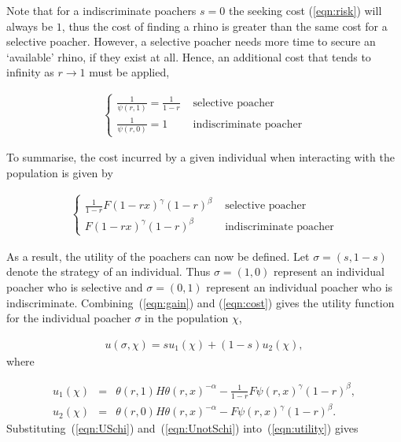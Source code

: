\documentclass[10pt]{article}
\begin{document}
Note that for a indiscriminate poachers \(s = 0\) the seeking 
cost (\ref{eqn:risk}) will always be \(1\), thus the cost of finding a rhino is greater
than the same cost for a selective poacher. However, a selective poacher needs 
more time to secure an `available' rhino, if they exist at all. Hence, an 
additional cost that tends to infinity as \(r \rightarrow 1\) must be applied, 

\begin{eqnarray}
    \label{eqn:selective_cost}
    \left\{
    \begin{array}{cl}
    \frac{1}{\psi(r, 1)} = \frac{1}{1 - r} & \mbox{ selective poacher}
    \\
    \frac{1}{\psi(r, 0)} = 1 & \mbox{ indiscriminate poacher}
    \end{array} \right.
\end{eqnarray}

To summarise, the cost incurred by a given individual when interacting with
the population is given by 

\begin{eqnarray}
    \label{eqn:cost}
    \left\{
    \begin{array}{cl}
    \frac{1}{1 - r}  F(1- rx)^{\gamma} (1-r)^{\beta}& \mbox{ selective poacher}
    \\
    F(1 - rx)^{\gamma} (1-r)^{\beta}& \mbox{ indiscriminate poacher}
    \end{array} \right.
\end{eqnarray}

As a result, the utility of the poachers can now be defined. Let \(\sigma = (s, 1 - s)\)
denote the strategy of an individual. Thus \(\sigma = (1, 0)\) represent an
individual poacher who is selective and \(\sigma = (0, 1)\) represent an individual
poacher who is indiscriminate. Combining~(\ref{eqn:gain}) and (\ref{eqn:cost})
gives the utility function for the individual poacher \(\sigma\) in the population
\(\chi\),

\begin{eqnarray}
\label{eqn:utility}
u(\sigma, \chi) = s u_1(\chi) +(1 - s) u_2(\chi),
\end{eqnarray}
where

\begin{eqnarray}
\label{eqn:USchi}
u_1(\chi) &=& \theta(r,1) H \theta(r,x)^{-\alpha}
- \frac{1}{1- r} F\psi(r, x)^{\gamma} (1-r)^{\beta} ,
\\
\label{eqn:UnotSchi}
u_2(\chi) &=& \theta(r,0) H \theta(r,x)^{-\alpha}
- F\psi(r, x)^{\gamma}  (1-r)^{\beta}.
\end{eqnarray}
Substituting~(\ref{eqn:USchi}) and~(\ref{eqn:UnotSchi}) into~(\ref{eqn:utility}) gives
\end{document}
